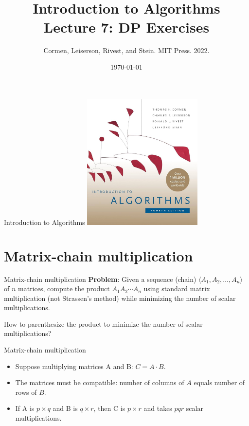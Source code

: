 \documentclass{beamer}
\title[L6 DP Ex]{Introduction to Algorithms \\ Lecture 7: DP Exercises}
\author{Cormen, Leiserson, Rivest, and Stein. MIT Press. 2022.}
\date{\today}
\begin{document}
\frame{\titlepage}

\begin{frame}{Introduction to Algorithms}
    \centering
    \includegraphics[width=0.45\textwidth]{figures/book_cover.jpg} \\
\end{frame}

\section{Matrix-chain multiplication}

\begin{frame}{Matrix-chain multiplication}
    \textbf{Problem}: Given a sequence (chain) $\langle A_1, A_2, \ldots, A_n\rangle$ of $n$ matrices, compute the product $A_1 A_2 \cdots A_n$ using standard matrix multiplication (not Strassen's method) while minimizing the number of scalar multiplications.

    \begin{alertblock}{}
        How to parenthesize the product to minimize the number of scalar multiplications?
    \end{alertblock}
\end{frame}

\begin{frame}{Matrix-chain multiplication}
    \begin{itemize}
        \item Suppose multiplying matrices A and B: $C = A \cdot B$.
        \item The matrices must be compatible: number of columns of $A$ equals number of rows of $B$.
        \item If A is $p \times q$ and B is $q \times r$, then C is $p \times r$ and takes $pqr$ scalar multiplications.
    \end{itemize}
\end{frame}
\end{document}
